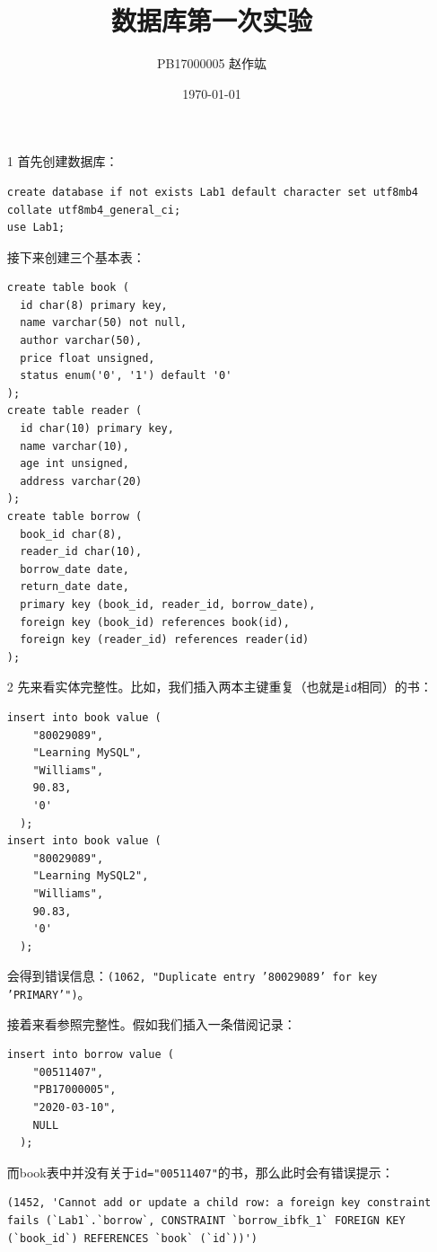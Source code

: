 \documentclass[UTF8,zihao=-4]{ctexart}
\title{\heiti 数据库\quad 第一次实验}
\author{PB17000005\quad \CJKfontspec{AR PL UKai CN} 赵作竑}
\date{\kaishu \today}
\begin{document}
	\maketitle
	\begin{enumerate}
		\item[1] 首先创建数据库：
		\begin{lstlisting}
create database if not exists Lab1 default character set utf8mb4 collate utf8mb4_general_ci;
use Lab1;
		\end{lstlisting} 
		接下来创建三个基本表：
		\begin{lstlisting}
create table book (
  id char(8) primary key,
  name varchar(50) not null,
  author varchar(50),
  price float unsigned,
  status enum('0', '1') default '0'
);
create table reader (
  id char(10) primary key,
  name varchar(10),
  age int unsigned,
  address varchar(20)
);
create table borrow (
  book_id char(8),
  reader_id char(10),
  borrow_date date,
  return_date date,
  primary key (book_id, reader_id, borrow_date),
  foreign key (book_id) references book(id),
  foreign key (reader_id) references reader(id)
);
		\end{lstlisting} 
		\item[2] 先来看实体完整性。比如，我们插入两本主键重复（也就是\texttt{id}相同）的书：
		\begin{lstlisting}
insert into book value (
    "80029089",
    "Learning MySQL",
    "Williams",
    90.83,
    '0'
  );
insert into book value (
    "80029089",
    "Learning MySQL2",
    "Williams",
    90.83,
    '0'
  );
		\end{lstlisting} 
		会得到错误信息：\texttt{(1062, "Duplicate entry '80029089' for key 'PRIMARY'")}。
		
		接着来看参照完整性。假如我们插入一条借阅记录：
		\begin{lstlisting}
insert into borrow value (
    "00511407",
    "PB17000005",
    "2020-03-10",
    NULL
  );
		\end{lstlisting}
		而book表中并没有关于\texttt{id="00511407"}的书，那么此时会有错误提示：
		\begin{lstlisting}
(1452, 'Cannot add or update a child row: a foreign key constraint fails (`Lab1`.`borrow`, CONSTRAINT `borrow_ibfk_1` FOREIGN KEY (`book_id`) REFERENCES `book` (`id`))')
		\end{lstlisting}


\end{enumerate}
\end{document}
